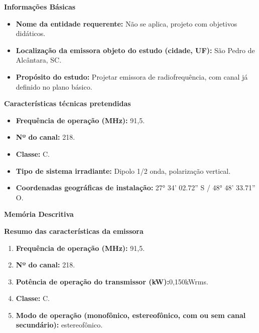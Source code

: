 
\textbf{Informações Básicas}

\begin{itemize}

\item \textbf{Nome da entidade requerente:} Não se aplica, projeto com objetivos didáticos.

\item \textbf{Localização da emissora objeto do estudo (cidade, UF):} São Pedro de Alcântara, SC.

\item \textbf{Propósito do estudo:} Projetar emissora de radiofrequência, com canal já definido no plano básico.

\end{itemize}

\textbf{Características técnicas pretendidas}

\begin{itemize}

\item  \textbf{Frequência de operação (MHz):} 91,5.

\item  \textbf{Nº do canal:} 218.

\item  \textbf{Classe:} C.

\item  \textbf{Tipo de sistema irradiante:} Dipolo 1/2 onda, polarização vertical.

\item  \textbf{Coordenadas geográficas de instalação:} 27° 34' 02.72'' S / 48° 48' 33.71'' O.

\end{itemize}

\textbf{Memória Descritiva}

\textbf{Resumo das características da emissora}

\begin{enumerate}

\item \textbf{Frequência de operação (MHz):} 91,5.

\item \textbf{Nº do canal:} 218.

\item \textbf{Potência de operação do transmissor (kW):}0,150kWrms.

\item \textbf{Classe:} C.

\item \textbf{Modo de operação (monofônico, estereofônico, com ou sem canal secundário):} estereofônico.

\end{enumerate}

